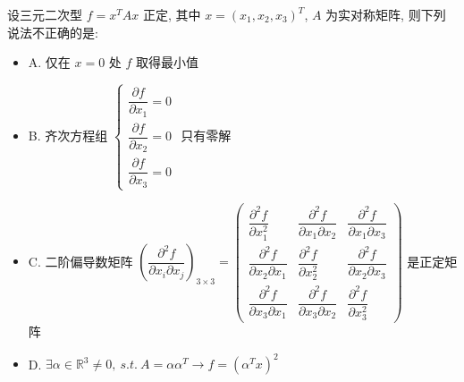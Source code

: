 \begin{example}[][Exam: 35.4.5]
	设三元二次型 $f=x^{T}Ax$ 正定, 其中 $x=(x_{1},x_{2},x_{3})^{T}$, $A$ 为实对称矩阵, 则下列说法不正确的是:  
\begin{itemize}
	\item A. 仅在 $x=0$ 处 $f$ 取得最小值
	\item B. 齐次方程组 $
	\begin{cases}
		\dfrac{\partial f}{\partial x_{1}}=0\\
		\dfrac{\partial f}{\partial x_{2}}=0\\
		\dfrac{\partial f}{\partial x_{3}}=0  
	\end{cases}$ 只有零解
	\item C. 二阶偏导数矩阵
	$\left(\dfrac{\partial^2 f}{\partial x_{i}\partial x_{j}}\right)_{3\times 3}=\begin{pmatrix}
		\dfrac{\partial^2 f}{\partial x_{1}^2}&\dfrac{\partial^2 f}{\partial x_{1}\partial x_{2}}&\dfrac{\partial^2 f}{\partial x_{1}\partial x_{3}}\\
		\dfrac{\partial^2 f}{\partial x_{2}\partial x_{1}}&\dfrac{\partial^2 f}{\partial x_{2}^2}&\dfrac{\partial^2 f}{\partial x_{2}\partial x_{3}}\\
		\dfrac{\partial^2 f}{\partial x_{3}\partial x_{1}}&\dfrac{\partial^2 f}{\partial x_{3}\partial x_{2}}&\dfrac{\partial^2 f}{\partial x_{3}^2}
	\end{pmatrix}$ 是正定矩阵
	\item D. $\exists \alpha\in \mathbb{R}^{3}\neq 0,\ s.t.\ A=\alpha\alpha^{T}\to f=(\alpha^{T}x)^2$
\end{itemize}
\end{example}
